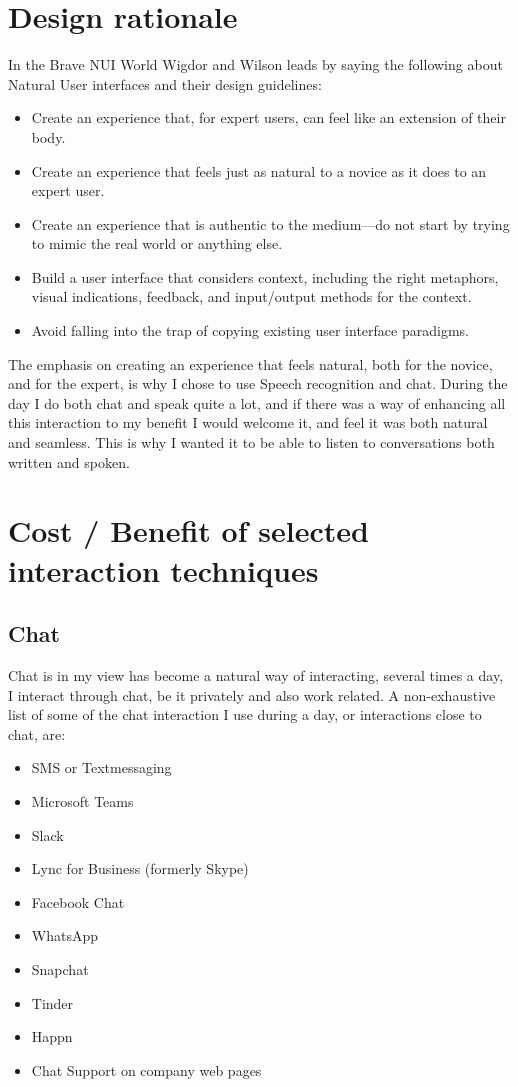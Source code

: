\documentclass[11pt,fleqn]{book} %
\begin{document}
\section{Design rationale}
In the Brave NUI World\cite{Wigdor2010BraveWorld} Wigdor and Wilson leads by saying the following about Natural User interfaces and their design guidelines:
\begin{itemize}
\item Create an experience that, for expert users, can feel like an extension of their body.
\item Create an experience that feels just as natural to a novice as it does to an
expert user.
\item Create an experience that is authentic to the medium—do not start by trying to
mimic the real world or anything else.
\item Build a user interface that considers context, including the right metaphors,
visual indications, feedback, and input/output methods for the context.
\item Avoid falling into the trap of copying existing user interface paradigms.
\end{itemize}

The emphasis on creating an experience that feels natural, both for the novice, and for the expert, is why I chose to use Speech recognition and chat. During the day I do both chat and speak quite a lot, and if there was a way of enhancing all this interaction to my benefit I would welcome it, and feel it was both natural and seamless.
This is why I wanted it to be able to listen to conversations both written and spoken.

\section{Cost / Benefit of selected interaction techniques}
\subsection{Chat}
Chat is in my view has become a natural way of interacting, several times a day, I interact through chat, be it privately and also work related. A non-exhaustive list of some of the chat interaction I use during a day, or interactions close to chat, are:
\begin{itemize}
\item SMS or Textmessaging
\item Microsoft Teams
\item Slack
\item Lync for Business (formerly Skype)
\item Facebook Chat
\item WhatsApp
\item Snapchat 
\item Tinder
\item Happn
\item Chat Support on company web pages
\end{itemize}
\end{document}
